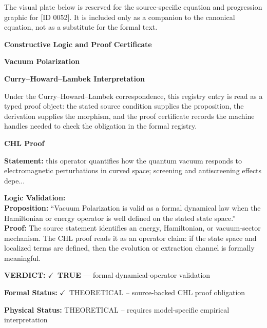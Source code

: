 \begingroup\footnotesize\sloppy
The visual plate below is reserved for the source-specific equation and progression graphic for [ID 0052]. It is included only as a companion to the canonical equation, not as a substitute for the formal text.
\par\endgroup
\ifTZPDarkEdition
{}
\fi

\clearpage
\begingroup\tzpsupportsetup
\noindent\textbf{\fontsize{10.8pt}{12.8pt}\selectfont [ID 0052] Constructive Logic and Proof Certificate}\par
\noindent\textbf{\fontsize{10pt}{12pt}\selectfont Vacuum Polarization}\par
\vspace{0.45em}
\begingroup
\footnotesize
\setlength{\parskip}{0.22em}
\setlength{\parindent}{0pt}
\noindent\textbf{Curry--Howard--Lambek Interpretation}\par
Under the Curry--Howard--Lambek correspondence, this registry entry is read as a typed proof
object: the stated source condition supplies the proposition, the derivation supplies the
morphism, and the proof certificate records the machine handles needed to check the obligation
in the formal registry.

\vspace{0.45em}
\noindent\textbf{CHL Proof}\par
\textbf{Statement:} this operator quantifies how the quantum vacuum responds to electromagnetic
perturbations in curved space; screening and antiscreening effects depe...

\textbf{Logic Validation:}\\
\textbf{Proposition:} ``Vacuum Polarization is valid as a formal dynamical law when the Hamiltonian or energy
operator is well defined on the stated state space.''\\
\textbf{Proof:} The source statement identifies an energy, Hamiltonian, or vacuum-sector mechanism. The
CHL proof reads it as an operator claim: if the state space and localized terms are
defined, then the evolution or extraction channel is formally meaningful.

\textbf{VERDICT:} \ensuremath{\checkmark}\ \textbf{TRUE} --- formal dynamical-operator validation

\textbf{Formal Status:} \ensuremath{\checkmark}\ THEORETICAL -- source-backed CHL proof obligation

\textbf{Physical Status:} THEORETICAL -- requires model-specific empirical interpretation
\par\vspace{0.45em}
\par
\ifTZPDarkEdition
{}
\fi
\endgroup
\endgroup
